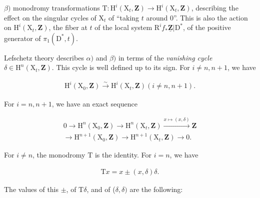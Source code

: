\documentclass[10pt,leqno]{article}
\begin{document}
\noindent \(\beta )\) monodromy transformations \(\mathrm{T} : \mathrm{H}^{i}(\mathrm{X}_{t},\mathbf{Z})\longrightarrow \mathrm{H}^{i}(\mathrm{X}_{t},\mathbf{Z})\), describing the effect on the singular cycles of \(\mathrm{X}_{t}\) of “taking \(t\) around 0”. This is also the action on \(\mathrm{H}^{i}(\mathrm{X}_{t},\mathbf{Z})\), the fiber at \(t\) of the local system \(\mathrm{R}^{i} f_{*}\underline{\mathbf{Z}}|\mathrm{D}^{*}\), of the positive generator of \(\pi _{1}(\mathrm{D}^{*},t)\).\par

\noindent Lefschetz theory describes \(\alpha )\) and \(\beta )\) in terms of the \emph{vanishing cycle} \(\delta \in \mathrm{H}^{n}(\mathrm{X}_{t},\mathbf{Z})\). This cycle is well defined up to its sign. For \(i\ne n,n+1\), we have\par

\begin{equation*}\begin{gathered}\mathrm{H}^{i}(\mathrm{X}_{0},\mathbf{Z}) \xrightarrow{\sim } \mathrm{H}^{i}(\mathrm{X}_{t},\mathbf{Z})    (i\ne n,n+1).\end{gathered}\end{equation*}

\noindent For \(i=n,n+1\), we have an exact sequence\par

\begin{equation*}\begin{gathered}0 \longrightarrow  \mathrm{H}^{n}(\mathrm{X}_{0},\mathbf{Z}) \longrightarrow  \mathrm{H}^{n}(\mathrm{X}_{t},\mathbf{Z}) \xrightarrow{x\longmapsto (x,\delta )} \mathbf{Z} \\ \longrightarrow  \mathrm{H}^{n+1}(\mathrm{X}_{0},\mathbf{Z}) \longrightarrow  \mathrm{H}^{n+1}(\mathrm{X}_{t},\mathbf{Z}) \longrightarrow  0.\end{gathered}\end{equation*}

\noindent For \(i\ne n\), the monodromy \(\mathrm{T}\) is the identity. For \(i=n\), we have\par

\begin{equation*}\begin{gathered}\mathrm{T}x = x \pm  (x,\delta )\delta .\end{gathered}\end{equation*}

\noindent The values of this \(\pm \), of \(\mathrm{T}\delta \), and of (\(\delta ,\delta )\) are the following:\par
\end{document}
